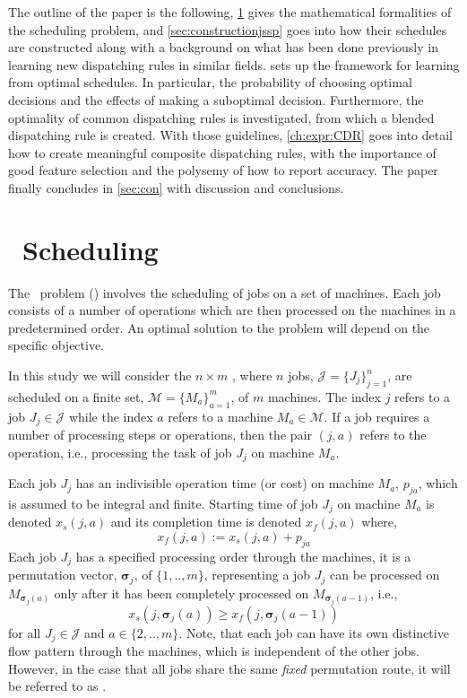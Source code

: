 \documentclass[smallextended]{svjour3}
\renewcommand{\vsigma}{\bm \sigma}
\begin{document}
The outline of the paper is the following, \cref{sec:problemdef} gives the 
mathematical formalities of the scheduling problem, and  
\cref{sec:constructionjssp} goes into how their schedules are constructed along 
with a background on what has been done previously in learning new dispatching 
rules in similar fields. 
 sets up the framework for learning from optimal schedules. In 
particular, the probability of choosing optimal decisions and the effects of 
making a suboptimal decision. 
Furthermore, the optimality of common dispatching rules is investigated, from 
which a blended dispatching rule is created. 
With those guidelines, \cref{ch:expr:CDR} goes into detail how to create 
meaningful composite dispatching rules, with the importance of good feature 
selection and the polysemy of how to report accuracy. 
The paper finally concludes in \cref{sec:con} with discussion and conclusions.


\section{\Jsp~Scheduling}\label{sec:problemdef}
The \jsp~problem (\JSP) involves the scheduling of jobs on a set of 
machines. Each job consists of a number of operations which are then processed 
on the machines in a predetermined order. An optimal solution to the problem 
will depend on the specific objective. 

In this study we will consider the $n\times m$ \JSP, where $n$ jobs, 
$\mathcal{J}=\{J_j\}_{j=1}^n$, are scheduled on a finite set, 
$\mathcal{M}=\{M_a\}_{a=1}^m$, of $m$ machines. The index $j$ refers to a job 
$J_j\in\mathcal{J}$ while the index  $a$ refers to a machine 
$M_a\in\mathcal{M}$. 
If a job requires a number of processing steps or operations, then the pair 
$(j,a)$ refers to the operation, i.e., processing the task of job $J_j$ on 
machine $M_a$. 

Each job $J_j$ has an indivisible operation time (or cost) on machine $M_a$, 
$p_{ja}$, which is assumed to be integral and finite. 
Starting time of job $J_j$ on machine $M_a$ is denoted $x_s(j,a)$ and its 
completion time is denoted $x_f(j,a)$ where, 
\begin{equation}  x_f(j,a):=x_s(j,a)+p_{ja} \end{equation} 
Each job $J_j$ has a specified processing order through the machines, it is a 
permutation vector, $\vsigma_j$, of $\{1,..,m\}$, representing a job $J_j$ can 
be processed on $M_{\vsigma_j(a)}$ only after it has been completely processed 
on $M_{\vsigma_j(a-1)}$, i.e.,
\begin{equation}\label{eq:permutation}
x_s(j,\vsigma_j(a)) \geq x_f(j,\vsigma_j(a-1)) 
\end{equation}
for all $J_j\in\mathcal{J}$ and $a\in\{2,..,m\}$. 
Note, that each job can have its own distinctive flow pattern through the 
machines, which is independent of the other jobs. However, in the case that all 
jobs share the same \emph{fixed} permutation route, it will be referred to as 
\FSP.
\end{document}
